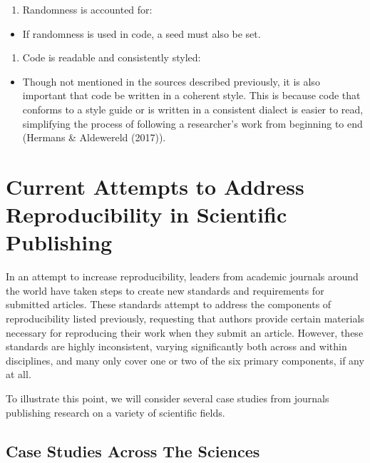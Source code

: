 \documentclass[12pt,twoside]{reedthesis}
\providecommand{\tightlist}{%
  \setlength{\itemsep}{0pt}\setlength{\parskip}{0pt}}
\begin{document}
\begin{enumerate}
\def\labelenumi{\arabic{enumi}.}
\setcounter{enumi}{4}
\tightlist
\item
  Randomness is accounted for:
\end{enumerate}
\begin{itemize}
\tightlist
\item
  If randomness is used in code, a seed must also be set.
\end{itemize}
\begin{enumerate}
\def\labelenumi{\arabic{enumi}.}
\setcounter{enumi}{5}
\tightlist
\item
  Code is readable and consistently styled:
\end{enumerate}
\begin{itemize}
\tightlist
\item
  Though not mentioned in the sources described previously, it is also important that code be written in a coherent style. This is because code that conforms to a style guide or is written in a consistent dialect is easier to read, simplifying the process of following a researcher's work from beginning to end (Hermans \& Aldewereld (2017)).
\end{itemize}
\hypertarget{current-attempts-to-address-reproducibility-in-scientific-publishing}{%
\section{Current Attempts to Address Reproducibility in Scientific Publishing}\label{current-attempts-to-address-reproducibility-in-scientific-publishing}}

In an attempt to increase reproducibility, leaders from academic journals around the world have taken steps to create new standards and requirements for submitted articles. These standards attempt to address the components of reproducibility listed previously, requesting that authors provide certain materials necessary for reproducing their work when they submit an article. However, these standards are highly inconsistent, varying significantly both across and within disciplines, and many only cover one or two of the six primary components, if any at all.

To illustrate this point, we will consider several case studies from journals publishing research on a variety of scientific fields.

\hypertarget{case-studies-across-the-sciences}{%
\subsection{Case Studies Across The Sciences}\label{case-studies-across-the-sciences}}
\end{document}
